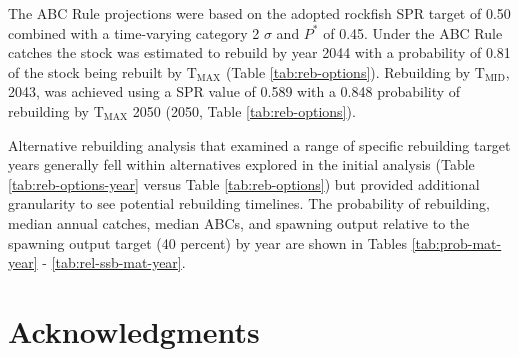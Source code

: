 \documentclass[11pt,
  english,
  a4paper,
]{article}
\begin{document}
\leavevmode\tagmcend\tagstructend\par


The ABC Rule projections were based on the adopted rockfish SPR target of 0.50 combined with a time-varying category 2 {\(\sigma\)\leavevmode\tagmcend\tagstructend} and {\(P^*\)\leavevmode\tagmcend\tagstructend} of 0.45. Under the ABC Rule catches the stock was estimated to rebuild by year 2044 with a probability of 0.81 of the stock being rebuilt by {\(\text{T}_\text{MAX}\)\leavevmode\tagmcend\tagstructend} (Table \ref{tab:reb-options}). Rebuilding by {\(\text{T}_\text{MID}\)\leavevmode\tagmcend\tagstructend}, 2043, was achieved using a SPR value of 0.589 with a 0.848 probability of rebuilding by {\(\text{T}_\text{MAX}\)\leavevmode\tagmcend\tagstructend} 2050 (2050, Table \ref{tab:reb-options}).

\leavevmode\tagmcend\tagstructend\par


Alternative rebuilding analysis that examined a range of specific rebuilding target years generally fell within alternatives explored in the initial analysis (Table \ref{tab:reb-options-year} versus Table \ref{tab:reb-options}) but provided additional granularity to see potential rebuilding timelines. The probability of rebuilding, median annual catches, median ABCs, and spawning output relative to the spawning output target (40 percent) by year are shown in Tables \ref{tab:prob-mat-year} - \ref{tab:rel-ssb-mat-year}.

\leavevmode\tagmcend\tagstructend\par


\hypertarget{acknowledgments}{%
\section{Acknowledgments}\label{acknowledgments}}

\leavevmode\tagmcend\tagstructend

\end{document}
